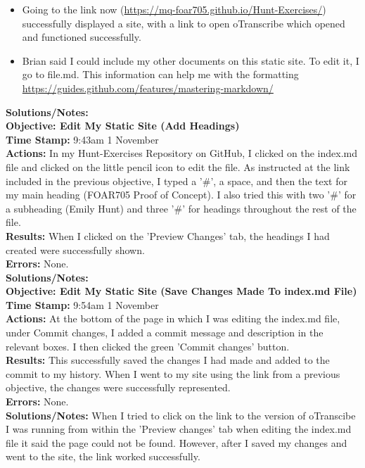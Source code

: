 \documentclass{article}
\begin{document}
\begin{FlushLeft}
\begin{itemize}
    \item Going to the link now (\url{https://mq-foar705.github.io/Hunt-Exercises/}) successfully displayed a site, with a link to open oTranscribe which opened and functioned successfully.
    \item Brian said I could include my other documents on this static site. To edit it, I go to file.md. This information can help me with the formatting \url{https://guides.github.com/features/mastering-markdown/}
\end{itemize}
\textbf{Solutions/Notes:}\\
\vspace{5mm}
\textbf{Objective: Edit My Static Site (Add Headings)} \\
\textbf{Time Stamp:} 9:43am 1 November\\
\textbf{Actions:} In my Hunt-Exercises Repository on GitHub, I clicked on the index.md file and clicked on the little pencil icon to edit the file. As instructed at the link included in the previous objective, I typed a '\#', a space, and then the text for my main heading (FOAR705 Proof of Concept). I also tried this with two '\#' for a subheading (Emily Hunt) and three '\#' for headings throughout the rest of the file.\\
\textbf{Results:} When I clicked on the 'Preview Changes' tab, the headings I had created were successfully shown.\\
\textbf{Errors:} None.\\
\textbf{Solutions/Notes:}\\
\vspace{5mm}
\textbf{Objective: Edit My Static Site (Save Changes Made To index.md File)}\\ 
\textbf{Time Stamp:} 9:54am 1 November\\
\textbf{Actions:} At the bottom of the page in which I was editing the index.md file, under Commit changes, I added a commit message and description in the relevant boxes. I then clicked the green 'Commit changes' button. \\
\textbf{Results:} This successfully saved the changes I had made and added to the commit to my history. When I went to my site using the link from a previous objective, the changes were successfully represented. \\
\textbf{Errors:} None.\\
\textbf{Solutions/Notes:} When I tried to click on the link to the version of oTranscibe I was running from within the 'Preview changes' tab when editing the index.md file it said the page could not be found. However, after I saved my changes and went to the site, the link worked successfully.\\

\end{FlushLeft}
\end{document}
